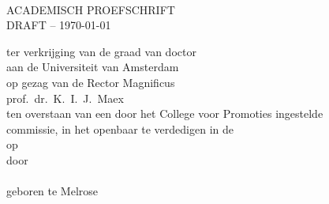 
%
%

\pagestyle{empty}
\setlength\parindent{0pt}

\makeatletter
{}
\makeatother



\begin{minipage}[c][190mm][c]{124mm}  %
\makeatletter
\begin{center}
	\vspace*{1.2cm}

	{ \huge \bf \@title }\\[2.7cm]

	\textsc{\Large ACADEMISCH PROEFSCHRIFT}\\[1.2cm]
	\ifdraft \textsc{\Large DRAFT -- \today}\\[1.0cm] \fi

	\linespread{1.2}
	\large \textrm{
		ter verkrijging van de graad van doctor \\
		aan de Universiteit van Amsterdam \\
		op gezag van de Rector Magnificus \\
		prof.~dr.~K.~I.~J.~Maex \\
		ten overstaan van een door het College voor Promoties ingestelde \\
		commissie, in het openbaar te verdedigen in de \@location \\
		op \@date \\
		\vspace{0.9cm}
		door \\[0.3cm]
		\vspace{0.9cm}
		{\bf \@author}\\[0.3cm]
 		geboren te Melrose \\[0.3cm]
	 }
\end{center}
\makeatother
\end{minipage}

